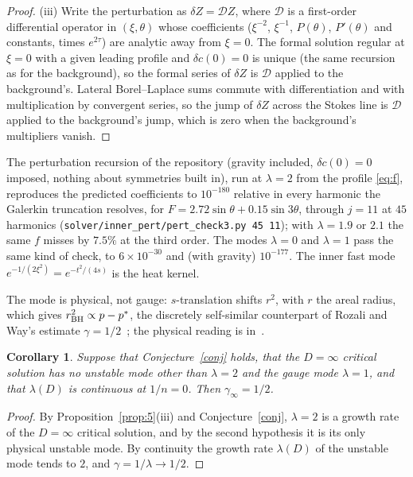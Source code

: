 \documentclass{amsart}
\numberwithin{equation}{section}
\theoremstyle{plain}
\newtheorem{corollary}{Corollary}
\theoremstyle{definition}
\theoremstyle{remark}
\newcommand{\repo}[1]{\texttt{#1}}
\begin{document}
\begin{proof}
(iii) Write the perturbation as $\delta Z = \mathcal D Z$, where $\mathcal D$ is a first-order differential operator in
$(\xi, \theta)$ whose coefficients ($\xi^{-2}$, $\xi^{-1}$, $P(\theta)$, $P'(\theta)$ and constants, times $e^{2\tau}$) are
analytic away from $\xi = 0$. The formal solution regular at $\xi = 0$ with a given leading profile and $\delta c(0) = 0$
is unique (the same recursion as for the background), so the formal series of $\delta Z$ is $\mathcal D$ applied to the
background's. Lateral Borel--Laplace sums commute with differentiation and with multiplication by convergent series, so
the jump of $\delta Z$ across the Stokes line is $\mathcal D$ applied to the background's jump, which is zero when the
background's multipliers vanish.
\end{proof}

The perturbation recursion of the repository (gravity included, $\delta c(0) = 0$ imposed, nothing about symmetries built
in), run at $\lambda = 2$ from the profile \eqref{eq:f}, reproduces the predicted coefficients to $10^{-180}$ relative in
every harmonic the Galerkin truncation resolves, for $F = 2.72\sin\theta + 0.15\sin3\theta$, through $j = 11$ at $45$
harmonics (\repo{solver/inner\_pert/pert\_check3.py 45 11}); with $\lambda = 1.9$ or $2.1$ the same $f$ misses by $7.5\%$ at
the third order. The modes $\lambda = 0$ and $\lambda = 1$ pass the same kind of check, to $6\times10^{-30}$ and (with
gravity) $10^{-177}$. The inner fast mode $e^{-1/(2\xi^2)} = e^{-t^2/(4s)}$ is the heat kernel.

The mode is physical, not gauge: $s$-translation shifts $r^2$, with $r$ the areal radius, which gives
$r_{\rm BH}^2 \propto p - p^*$, the discretely self-similar counterpart of Rozali and Way's estimate
$\gamma = 1/2$~\cite{RozaliWay2018}; the physical reading is in~\cite{companion}.

\begin{corollary}\label{cor:gamma}
Suppose that Conjecture~\ref{conj} holds, that the $D = \infty$ critical solution has no unstable mode other than
$\lambda = 2$ and the gauge mode $\lambda = 1$, and that $\lambda(D)$ is continuous at $1/n = 0$. Then
$\gamma_\infty = 1/2$.
\end{corollary}

\begin{proof}
By Proposition~\ref{prop:5}(iii) and Conjecture~\ref{conj}, $\lambda = 2$ is a growth rate of the $D = \infty$ critical
solution, and by the second hypothesis it is its only physical unstable mode. By continuity the growth rate $\lambda(D)$
of the unstable mode tends to $2$, and $\gamma = 1/\lambda \to 1/2$.
\end{proof}
\end{document}
